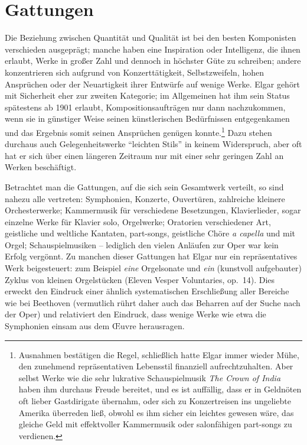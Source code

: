\documentclass[a4paper,11pt,open=any]{scrbook}
\begin{document}
\section{Gattungen}
Die Beziehung zwischen Quantität und Qualität ist bei den besten
Komponisten verschieden ausgeprägt; manche haben eine Inspiration oder
Intelligenz, die ihnen erlaubt, Werke in großer Zahl und dennoch in
höchster Güte zu schreiben; andere konzentrieren sich aufgrund von
Konzerttätigkeit, Selbstzweifeln, hohen Ansprüchen oder der Neuartigkeit
ihrer Entwürfe auf wenige Werke.  Elgar gehört mit Sicherheit eher zur
zweiten Kategorie; im Allgemeinen hat ihm sein Status spätestens ab 1901
erlaubt, Kompositionsaufträgen nur dann nachzukommen, wenn sie in günstiger
Weise seinen künstlerischen Bedürfnissen entgegenkamen und das Ergebnis
somit seinen Ansprüchen genügen konnte.\footnote{Ausnahmen bestätigen
die Regel, schließlich hatte Elgar immer wieder Mühe, den zunehmend
repräsentativen Lebensstil finanziell aufrechtzuhalten.  Aber selbst Werke
wie die sehr lukrative Schauspielmusik \textit{The Crown of India} haben
ihm durchaus Freude bereitet, und es ist auffällig, dass er in Geldnöten
oft lieber Gastdirigate übernahm, oder sich zu Konzertreisen ins ungeliebte
Amerika überreden ließ, obwohl es ihm sicher ein leichtes gewesen wäre, das
gleiche Geld mit effektvoller Kammermusik oder salonfähigen part-songs zu
verdienen.}  Dazu stehen durchaus auch Gelegenheitswerke \enquote{leichten
Stils} in keinem Widerspruch, aber oft hat er sich über einen längeren
Zeitraum nur mit einer sehr geringen Zahl an Werken beschäftigt.

Betrachtet man die Gattungen, auf die sich sein Gesamtwerk verteilt,
so sind nahezu alle vertreten: Symphonien, Konzerte, Ouvertüren,
zahlreiche kleinere Orchesterwerke; Kammermusik für verschiedene
Besetzungen, Klavierlieder, sogar einzelne Werke für Klavier solo,
Orgelwerke; Oratorien verschiedener Art, geistliche und weltliche
Kantaten, part-songs, geistliche Chöre \textit{a capella} und mit Orgel;
Schauspielmusiken – lediglich den vielen Anläufen zur Oper war kein Erfolg
vergönnt.  Zu manchen dieser Gattungen hat Elgar nur ein repräsentatives
Werk beigesteuert: zum Beispiel \textit{eine} Orgelsonate und \textit{ein}
(kunstvoll aufgebauter\cite[S.~114]{butt-rcath}) Zyklus von kleinen
Orgelstücken (Eleven Vesper Voluntaries, op.~14).  Dies erweckt den
Eindruck einer ähnlich systematischen Erschließung aller Bereiche wie
bei Beethoven (vermutlich rührt daher auch das Beharren auf der Suche
nach der Oper) und relativiert den Eindruck, dass wenige Werke wie etwa
die Symphonien einsam aus dem Œuvre herausragen.
\end{document}
